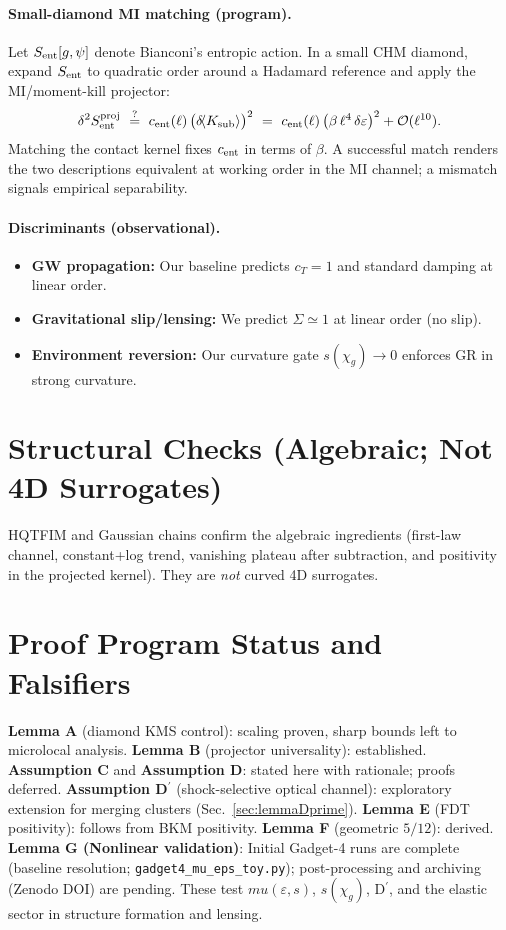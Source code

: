\documentclass[aps,prd,onecolumn,superscriptaddress,nofootinbib]{revtex4-2}
\def\mu{mu}%
\begin{document}
\paragraph{Small-diamond MI matching (program).}
Let \(S_{\rm ent}[g,\psi]\) denote Bianconi’s entropic action. In a small CHM diamond, expand \(S_{\rm ent}\) to quadratic order around a Hadamard reference and apply the MI/moment-kill projector:
\[
\delta^2 S_{\rm ent}^{\rm proj}\ \stackrel{?}{=}\ c_{\rm ent}(\ell)\,\big(\delta\!\langle K_{\rm sub}\rangle\big)^2
\ =\ c_{\rm ent}(\ell)\,\big(\beta\,\ell^4\,\delta\varepsilon\big)^2 + \mathcal O(\ell^{10}).
\]
Matching the contact kernel fixes \(c_{\rm ent}\) in terms of \(\beta\). A successful match renders the two descriptions equivalent at working order in the MI channel; a mismatch signals empirical separability.

\paragraph{Discriminants (observational).}
\begin{itemize}[leftmargin=*,noitemsep,topsep=0pt]
\item \textbf{GW propagation:} Our baseline predicts \(c_T=1\) and standard damping at linear order.
\item \textbf{Gravitational slip/lensing:} We predict \(\Sigma\simeq 1\) at linear order (no slip).
\item \textbf{Environment reversion:} Our curvature gate \(s(\chi_g)\to 0\) enforces GR in strong curvature.
\end{itemize}

\section{Structural Checks (Algebraic; Not 4D Surrogates)}
\label{sec:substrates}
HQTFIM and Gaussian chains confirm the algebraic ingredients (first-law channel, constant+log trend, vanishing plateau after subtraction, and positivity in the projected kernel). They are \emph{not} curved 4D surrogates.

\section{Proof Program Status and Falsifiers}
\label{sec:program}
\textbf{Lemma A} (diamond KMS control): scaling proven, sharp bounds left to microlocal analysis. \textbf{Lemma B} (projector universality): established. \textbf{Assumption C} and \textbf{Assumption D}: stated here with rationale; proofs deferred. \textbf{Assumption D\(^{\prime}\)} (shock-selective optical channel): exploratory extension for merging clusters (Sec.~\ref{sec:lemmaDprime}). \textbf{Lemma E} (FDT positivity): follows from BKM positivity. \textbf{Lemma F} (geometric \(5/12\)): derived.\\
\textbf{Lemma G (Nonlinear validation)}: Initial Gadget-4 runs are complete (baseline resolution; \texttt{gadget4\_mu\_eps\_toy.py}); post-processing and archiving (Zenodo DOI) are pending. These test \(\mu(\varepsilon,s)\), \(s(\chi_g)\), D\(^{\prime}\), and the elastic sector in structure formation and lensing.
\end{document}
